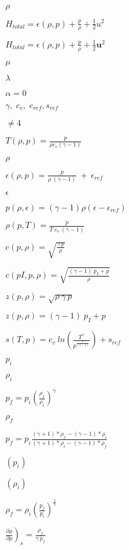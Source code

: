 \documentclass{article}
\begin{document}
$\rho $
\pagebreak

$H_{total} =  \epsilon (\rho, p)  +  \frac{p}{\rho}  +  \frac{1}{2}u^2 $
\pagebreak

$H_{total} =  \epsilon (\rho, p)  +  \frac{p}{\rho}  +  \frac{1}{2}\bm{u}^2 $
\pagebreak

$ \mu $
\pagebreak

$ \lambda $
\pagebreak

$\alpha = 0 $
\pagebreak

$ \gamma, \; c_v, \; e_{ref},  s_{ref}$
\pagebreak

$ \neq 4$
\pagebreak

$  T(\rho, p)  =   \frac{p}{\rho c_v (\gamma-1)}$
\pagebreak

$\rho$
\pagebreak

$  \epsilon (\rho, p)  = \frac{p}{\rho \ (\gamma-1)} \ + \ \epsilon_{ref}$
\pagebreak

$\epsilon$
\pagebreak

$  p(\rho, \epsilon)  = (\gamma-1)\rho(\epsilon  - \epsilon_{ref}) $
\pagebreak

$  \rho(p, T)  =  \frac{p}{T \ c_v \ (\gamma-1)}\ $
\pagebreak

$  c(p, \rho)  = \sqrt{  \frac{\gamma \ p}{\rho}} $
\pagebreak

$  c(pI, p, \rho)  = \sqrt{  \frac{(\gamma-1) \ p_I + p}{\rho}} $
\pagebreak

$  z(p, \rho)  = \sqrt{ \rho \ \gamma \ p } $
\pagebreak

$  z(p, \rho)  = (\gamma-1) \ p_I + p $
\pagebreak

$  s(T, p)  = c_v \ ln \left( \frac{T^\gamma}  { p^\frac{\gamma}{(\gamma-1)} } \right)+s_{ref} $
\pagebreak

$ p_i $
\pagebreak

$ \rho_i $
\pagebreak

$  p_f  = p_i  \left( \frac{\rho_f}{\rho_i} \right) ^\gamma   $
\pagebreak

$ \rho_f $
\pagebreak

$ p_f = p_i \frac{  (\gamma+1)*\rho_f - (\gamma-1)*\rho_i  }{  (\gamma+1)*\rho_i-(\gamma-1)*\rho_f  }  $
\pagebreak

$ (p_i) $
\pagebreak

$ (\rho_i ) $
\pagebreak

$ \rho_f = \rho_i \left( \frac{p_f}{ p_i}\right) ^\frac{1}{\gamma} $
\pagebreak

$  \left.  \frac{\partial \rho}{\partial p} \right)_s   = \frac{\rho_f}{ \gamma \ p_f}  $
\pagebreak
\end{document}
